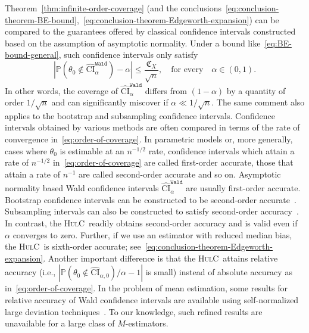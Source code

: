 \documentclass{article}
\newcommand{\hulc}{\textsc{HulC}~}
\numberwithin{myalgctr}{section}
\begin{document}
Theorem~\ref{thm:infinite-order-coverage} (and the conclusions~\eqref{eq:conclusion-theorem-BE-bound},~\eqref{eq:conclusion-theorem-Edgeworth-expansion}) can be compared to the guarantees offered by classical confidence intervals constructed based on the assumption of asymptotic normality. Under a bound like~\eqref{eq:BE-bound-general}, such confidence intervals only satisfy
\begin{equation}\label{eq:order-of-coverage}
\left|\mathbb{P}\left(\theta_0 \notin \widehat{\mathrm{CI}}^{\texttt{Wald}}_{\alpha}\right) - \alpha\right| \le \frac{\mathfrak{C}_X}{\sqrt{n}},\quad\mbox{for every}\quad \alpha\in(0, 1).
\end{equation}
In other words, the coverage of $\widehat{\mathrm{CI}}^{\texttt{Wald}}_{\alpha}$ differs from $(1-\alpha)$ by a quantity of order $1/\sqrt{n}$ and can significantly miscover if $\alpha \ll 1/\sqrt{n}$. The same comment also applies to the bootstrap and subsampling confidence intervals. Confidence intervals obtained by various methods are often compared in terms of the rate of convergence in~\eqref{eq:order-of-coverage}. In parametric models or, more generally, cases where $\theta_0$ is estimable at an $n^{-1/2}$ rate, confidence intervals which attain a rate of $n^{-1/2}$ in~\eqref{eq:order-of-coverage} are called first-order accurate, those that attain a rate of $n^{-1}$ are called second-order accurate and so on. Asymptotic normality based Wald confidence intervals $\widehat{\mathrm{CI}}_{\alpha}^{\texttt{Wald}}$ are usually first-order accurate. Bootstrap confidence intervals can be constructed to be second-order accurate~\citep{hall1986bootstrap,hall1988theoretical,mammen1992bootstrap}. Subsampling intervals can also be constructed to satisfy second-order accuracy~\citep{bertail2001extrapolation}. In contrast, the \hulc readily obtains second-order accuracy and is valid even if $\alpha$ converges to zero. Further, if we use an estimator with reduced median bias, the \hulc is sixth-order accurate{\color{black}; see}~\eqref{eq:conclusion-theorem-Edgeworth-expansion}. Another important difference is that the \hulc attains relative accuracy (i.e., $|\mathbb{P}(\theta_0\notin\widehat{\mathrm{CI}}_{\alpha,0})/\alpha - 1|$ is small) instead of absolute accuracy as in~\eqref{eq:order-of-coverage}. In the problem of mean estimation, some results for relative accuracy of Wald confidence intervals are available using self-normalized large deviation techniques~\citep{shao1997self,jing2003self}. To our knowledge, such refined results are unavailable for a large class of $M$-estimators.
\end{document}
